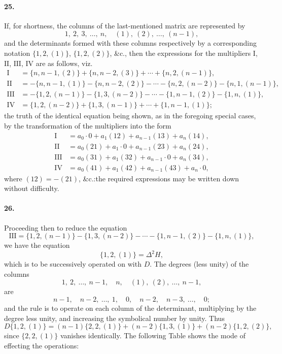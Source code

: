 \documentclass[11pt,a4paper]{book}
\begin{document}
\paragraph{25.}
If,  for  shortness,  the  columns  of  the  last-mentioned  matrix  are  represented  by
\[
1,\ 2,\ 3,\ \ldots,\ n,\quad (1),\ (2),\ \ldots,\ (n-1),
\]
and  the  determinants  formed  with  these  columns  respectively  by  a  corresponding
notation  $\{1, 2, (1)\}$, $\{1, 2, (2)\}$, \&c.,  then  the  expressions  for  the  multipliers  $\mathrm{I}$, $\mathrm{II}$, $\mathrm{III}$, $\mathrm{IV}$
are  as  follows,  viz.
\begin{align*}
\mathrm{I}   &= \{n, n-1, (2)\} + \{n, n-2, (3)\} + \cdots + \{n, 2, (n-1)\}, \\
\mathrm{II}  &= -\{n, n-1, (1)\} - \{n, n-2, (2)\} - \cdots - \{n, 2, (n-2)\} - \{n, 1, (n-1)\}, \\
\mathrm{III} &= -\{1, 2, (n-1)\} - \{1, 3, (n-2)\} - \cdots - \{1, n-1, (2)\} - \{1, n, (1)\}, \\
\mathrm{IV}  &= \{1, 2, (n-2)\} + \{1, 3, (n-1)\} + \cdots + \{1, n-1, (1)\};
\end{align*}
the  truth  of  the  identical  equation  being  shown,  as  in  the  foregoing  special  cases,  by
the  transformation  of  the  multipliers  into  the  form
\begin{align*}
\mathrm{I}   &= a_0 \cdot 0 + a_1(12) + a_{n-1}(13) + a_n(14), \\
\mathrm{II}  &= a_0(21) + a_1 \cdot 0 + a_{n-1}(23) + a_n(24), \\
\mathrm{III} &= a_0(31) + a_1(32) + a_{n-1} \cdot 0 + a_n(34), \\
\mathrm{IV}  &= a_0(41) + a_1(42) + a_{n-1}(43) + a_n \cdot 0,
\end{align*}
where  $(12) = -(21)$,  \&c.:\@  the  required  expressions  may  be  written  down  without
difficulty.

\paragraph{26.}
Proceeding  then  to  reduce  the  equation
\[
\mathrm{III} = \{1, 2, (n-1)\} - \{1, 3, (n-2)\} - \cdots - \{1, n-1, (2)\} - \{1, n, (1)\},
\]
we  have  the  equation
\[
\{1, 2, (1)\} = \Delta^2 H,
\]
which  is  to  be  successively  operated  on  with  $D$.  The  degrees  (less  unity)  of  the
columns
\[
1,\ 2,\ \ldots,\ n-1,\quad n,\quad (1),\ (2),\ \ldots,\ n-1,
\]
are
\[
n-1,\quad n-2,\ \ldots,\ 1,\quad 0,\quad n-2,\quad n-3,\ \ldots,\quad 0;
\]
and  the  rule  is  to  operate  on  each  column  of  the  determinant,  multiplying  by  the
degree  less  unity,  and  increasing  the  symbolical  number  by  unity.     Thus
\[
D\{1, 2, (1)\} = (n-1)\{2, 2, (1)\} + (n-2)\{1, 3, (1)\} + (n-2)\{1, 2, (2)\},
\]
since  $\{2, 2, (1)\}$  vanishes  identically.     The   following  Table   shows   the   mode   of  effecting
the  operations:
\end{document}
